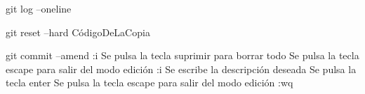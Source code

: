 	git log --oneline	%

	git reset --hard CódigoDeLaCopia	%

	git commit --amend	%
		:i	%
		Se pulsa la tecla suprimir para borrar todo
		Se pulsa la tecla escape para salir del modo edición
		:i	%
		Se escribe la descripción deseada
		Se pulsa la tecla enter
		Se pulsa la tecla escape para salir del modo edición
		:wq	%






